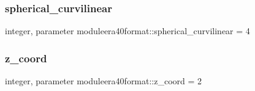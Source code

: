 \subsubsection{\texorpdfstring{spherical\+\_\+curvilinear}{spherical\_curvilinear}}
{\footnotesize\ttfamily integer, parameter moduleera40format\+::spherical\+\_\+curvilinear = 4\hspace{0.3cm}{\ttfamily [private]}}

\mbox{\label{namespacemoduleera40format_ae4ff4503bcd3d89b98e392ca67b2ef13}} 
\subsubsection{\texorpdfstring{z\+\_\+coord}{z\_coord}}
{\footnotesize\ttfamily integer, parameter moduleera40format\+::z\+\_\+coord = 2\hspace{0.3cm}{\ttfamily [private]}}

